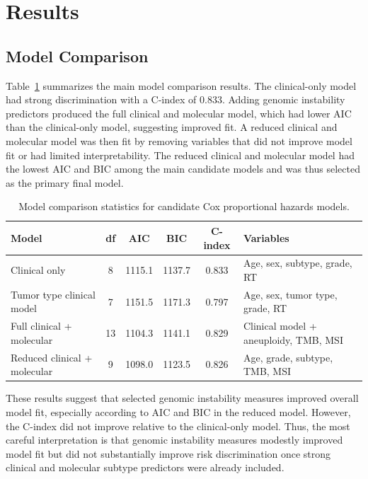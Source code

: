 \documentclass[paper=a4, fontsize=11pt]{scrartcl}
\numberwithin{equation}{section}		%
\numberwithin{figure}{section}			%
\numberwithin{table}{section}				%
\begin{document}
\section{Results}

\subsection{Model Comparison} 

Table~\ref{tab:model} summarizes the main model comparison results. The clinical-only model had strong discrimination with a C-index of 0.833. Adding genomic instability predictors produced the full clinical and molecular model, which had lower AIC than the clinical-only model, suggesting improved fit. A reduced clinical and molecular model was then fit by removing variables that did not improve model fit or had limited interpretability. The reduced clinical and molecular model had the lowest AIC and BIC among the main candidate models and was thus selected as the primary final model.

\begin{table}[H] 
\scriptsize
\centering   
\begin{tabular}{lccccl} 
\toprule 
\textbf{Model} & \textbf{df} & \textbf{AIC} & \textbf{BIC} & \textbf{C-index} & \textbf{Variables} \\ 
\midrule 
Clinical only & 8 & 1115.1 & 1137.7 & 0.833 & Age, sex, subtype, grade, RT \\ Tumor type clinical model & 7 & 1151.5 & 1171.3 & 0.797 & Age, sex, tumor type, grade, RT \\ 
Full clinical + molecular & 13 & 1104.3 & 1141.1 & 0.829 & Clinical model + aneuploidy, TMB, MSI \\ 
Reduced clinical + molecular & 9 & 1098.0 & 1123.5 & 0.826 & Age, grade, subtype, TMB, MSI \\ 
\bottomrule 
\end{tabular} 
\caption{Model comparison statistics for candidate Cox proportional hazards models.}
\label{tab:model}
\end{table}

\noindent
These results suggest that selected genomic instability measures improved overall model fit, especially according to AIC and BIC in the reduced model. However, the C-index did not improve relative to the clinical-only model. Thus, the most careful interpretation is that genomic instability measures modestly improved model fit but did not substantially improve risk discrimination once strong clinical and molecular subtype predictors were already included.
\end{document}
